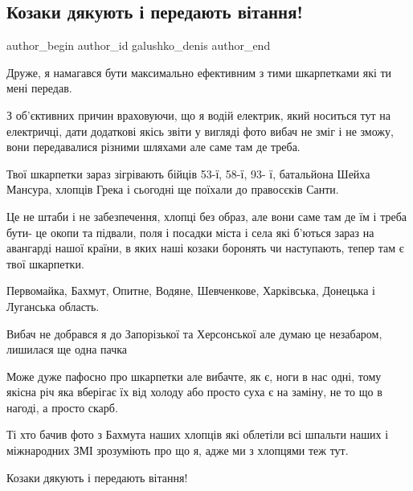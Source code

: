  
 
 
 
 

\subsection{ Козаки дякують і передають вітання!}
\label{sec:29_11_2022.fb.galushko_denis.1._kozaki_dyakuyut___p}

\ifcmt
 author_begin
   author_id galushko_denis
 author_end
\fi

Друже, я намагався бути максимально ефективним з тими шкарпетками які ти мені
передав.

З об'єктивних причин враховуючи, що я водій електрик, який носиться тут на
електричці, дати додаткові якісь звіти у вигляді фото вибач не зміг і не зможу,
вони передавалися різними шляхами але саме там де треба. 

Твої шкарпетки зараз зігрівають бійців 53-ї, 58-ї, 93- ї, батальйона Шейха
Мансура, хлопців Грека і сьогодні ще поїхали до правосєків Санти.

Це не штаби і не забезпечення, хлопці без образ, але вони саме там де їм і
треба бути- це окопи та підвали, поля і посадки міста і села які б'ються зараз
на авангарді нашої країни, в яких наші козаки боронять чи наступають, тепер там
є твої шкарпетки.

Первомайка, Бахмут, Опитне, Водяне, Шевченкове, Харківська, Донецька і
Луганська область. 

Вибач не добрався я до Запорізької та Херсонської але думаю це незабаром,
лишилася ще одна пачка💪🏻🇺🇦 

Може дуже пафосно про шкарпетки але вибачте, як є, ноги в нас одні, тому якісна
річ яка вберігає їх від холоду або просто суха є на заміну, не то що в нагоді,
а просто скарб. 

Ті хто бачив фото з Бахмута наших хлопців які облетіли всі шпальти наших і
міжнародних ЗМІ зрозуміють про що я, адже ми з хлопцями теж тут. 

Козаки дякують і передають вітання!
